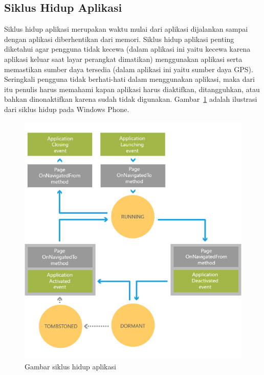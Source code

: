 \subsection{Siklus Hidup Aplikasi}
\label{subsec:Siklus Hidup Aplikasi}
\hspace{0.5cm} Siklus hidup aplikasi merupakan waktu mulai dari aplikasi dijalankan sampai dengan aplikasi diberhentikan dari memori. Siklus hidup aplikasi penting diketahui agar pengguna tidak kecewa (dalam aplikasi ini yaitu kecewa karena aplikasi keluar saat layar perangkat dimatikan) menggunakan aplikasi serta memastikan sumber daya tersedia (dalam aplikasi ini yaitu sumber daya GPS). Seringkali pengguna tidak berhati-hati dalam menggunakan aplikasi, maka dari itu penulis harus memahami kapan aplikasi harus diaktifkan, ditangguhkan, atau bahkan dinonaktifkan karena sudah tidak digunakan. Gambar~\ref{fig:Siklus Hidup Aplikasi} adalah ilustrasi dari siklus hidup pada Windows Phone.

\begin{figure}[h]
	\centering
		\includegraphics[scale=0.4]{Gambar/lifecycle_wp8}
	\caption{Gambar siklus hidup aplikasi\cite{MSDN}}
	\label{fig:Siklus Hidup Aplikasi}
\end{figure}

